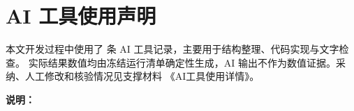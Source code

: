 \documentclass[UTF8,a4paper,zihao=-4,fontset=none]{ctexart}
\begin{document}
\ifdefined\MMPrintTarget
  
  \clearpage
\fi
{}
\setcounter{page}{1}

\clearpage
\DemoNotice

\section*{AI 工具使用声明}
本文开发过程中使用了 \AIUsageRecordCount{} 条 AI 工具记录，主要用于结构整理、代码实现与文字检查。
实际结果数值均由冻结运行清单确定性生成，AI 输出不作为数值证据。采纳、人工修改和核验情况见支撑材料
《AI工具使用详情》。\ifx\AIUsageFixtureNotice\empty\else\par\textbf{说明：}\AIUsageFixtureNotice\fi


\label{mmagent-body-end}
\clearpage
\appendix

\end{document}
